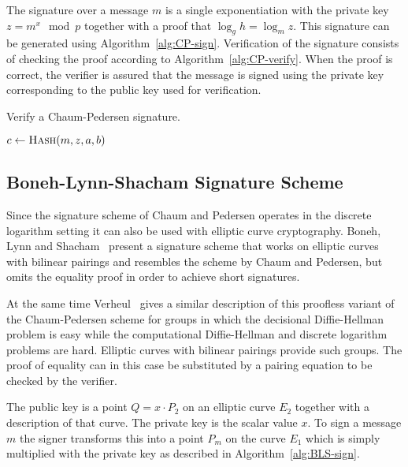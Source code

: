 The signature over a message $m$ is a single exponentiation with the private key
$z = m^x \mod p$ together with a proof that $\log_g h = \log_m z$. This
signature can be generated using Algorithm~\ref{alg:CP-sign}. Verification of
the signature consists of checking the proof according to
Algorithm~\ref{alg:CP-verify}. When the proof is correct, the verifier is
assured that the message is signed using the private key corresponding to the
public key used for verification.

\begin{algorithm}[t]
  \caption{Verify a Chaum-Pedersen signature.}
  \label{alg:CP-verify}
  \addtolength{\baselineskip}{1mm}
  \begin{algorithmic}[1]
      \State $c \gets \Call{Hash}{m, z, a, b}$

      \Return {}
      \EndIf

      \Return {}
      \EndIf

      \Return {}
    \EndFunction
  \end{algorithmic}
\end{algorithm}

\subsection{Boneh-Lynn-Shacham Signature Scheme}

Since the signature scheme of Chaum and Pedersen operates in the discrete
logarithm setting it can also be used with elliptic curve cryptography. Boneh,
Lynn and Shacham~\cite{BonehLS01,BonehLS04} present a signature scheme that
works on elliptic curves with bilinear pairings and resembles the scheme by
Chaum and Pedersen, but omits the equality proof in order to achieve short
signatures.

At the same time Verheul~\cite{Verheul01} gives a similar description of this
proofless variant of the Chaum-Pedersen scheme for groups in which the
decisional Diffie-Hellman problem is easy while the computational Diffie-Hellman
and discrete logarithm problems are hard. Elliptic curves with bilinear pairings
provide such groups. The proof of equality can in this case be substituted by a
pairing equation to be checked by the verifier.

The public key is a point $Q = x \cdot P_2$ on an elliptic curve $E_2$ together
with a description of that curve. The private key is the scalar value $x$. To
sign a message $m$ the signer transforms this into a point $P_m$ on the curve
$E_1$ which is simply multiplied with the private key as described in
Algorithm~\ref{alg:BLS-sign}.

